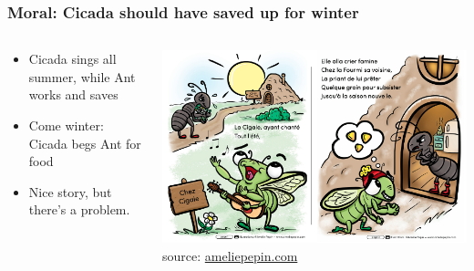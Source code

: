 \documentclass[aspectratio=169]{beamer}
\begin{document}
\begin{frame}[label=top]
    \frametitle{\Large{Moral: Cicada should have saved up for winter}}
    \begin{columns}
    \begin{column}{0.4\textwidth}
        \begin{itemize}
            \item Cicada sings all summer, while Ant works and saves 
            \item Come winter: Cicada begs Ant for food
            \newline
            \item Nice story, but there's a problem.
        \end{itemize}
    \end{column}
    \begin{column}{0.6\textwidth}  %
    \begin{center}
    \includegraphics[scale=0.40]{pics/cigaleFourmi2.png}
    {\tiny source: \href{https://www.ameliepepin.com/}{ameliepepin.com}}
    \end{center}
    \end{column}
    \end{columns}
\end{frame}  
\end{document}
